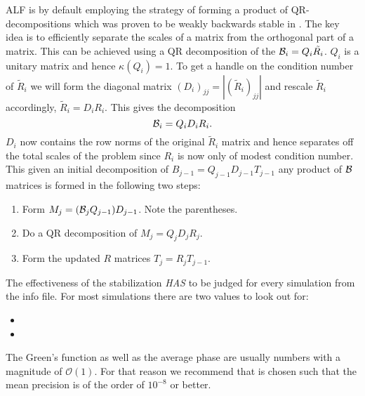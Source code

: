 ALF is by default employing
the strategy of forming a product of QR-decompositions which was proven to be weakly backwards stable in \cite{Bai2011}.
The key idea is to efficiently separate the scales of a matrix from the orthogonal part of a matrix.
This can be achieved using a QR decomposition of the ${\cal B}_i = Q_i \tilde{R_i}$. $Q_i$ is a unitary matrix and hence $\kappa(Q_i) = 1$.
To get a handle on the condition number of $\tilde{R}_i$ we will form the
diagonal matrix $(D_i)_{jj} = |(\tilde{R}_i)_{jj}|$ and rescale $\tilde{R}_i$ accordingly, $\tilde{R}_i = D_i R_i$.
This gives the decomposition
\begin{equation}
{\cal B}_i = Q_i D_i R_i.
\end{equation}
$D_i$ now contains the row norms of the original $\tilde{R}_i$ matrix and hence separates off the total scales of the problem since $R_i$ is now only of modest condition number.  
This given an initial decomposition of $B_{j-1} = Q_{j-1} D_{j-1} T_{j-1}$ any product 
of ${\cal B}$ matrices is formed in the following two steps:
\begin{enumerate}
\item Form $ M_j = ({\cal B}_j Q_{j-1}) D_{j-1}$. Note the parentheses.
\item Do a QR decomposition of $M_j = Q_j D_j R_j$.
\item Form the updated $R$ matrices $T_j = R_j T_{j-1}$.
\end{enumerate}
The effectiveness of the stabilization \emph{HAS} to be judged for every simulation from the info
file. For most simulations there are two values to look out for:
\begin{itemize}
\item {}
\item {}
\end{itemize}
The Green's function as well as the average phase are usually numbers with a magnitude of $\mathcal{O} (1)$. 
For that reason we recommend that  is chosen such that the mean precision is  of the order of $10^{-8}$  or better.  

